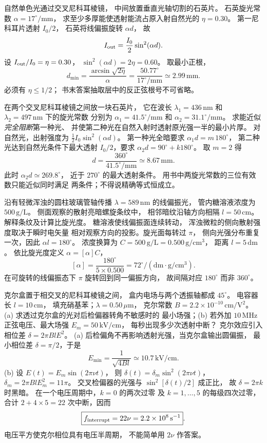 自然单色光通过交叉尼科耳棱镜，
中间放置垂直光轴切割的石英片。
石英旋光常数 $\alpha=17^\circ/\mathrm{mm}$，
求至少多厚能使透射能流占原入射自然光的
$\eta=0.30$。
\exsolution
第一尼科耳片透射 $I_0/2$，
石英将线偏振旋转 $\alpha d$，
故
\[
 I_{\rm out}=\frac{I_0}{2}\sin^2(\alpha d).
\]
设 $I_{\rm out}/I_0=\eta=0.30$，
$\sin^2(\alpha d)=2\eta=0.60$。
取最小正根，
\[
 \boxed{d_{\min}=
 \frac{\arcsin\sqrt{2\eta}}{\alpha}
 =\frac{50.77^\circ}{17^\circ/\mathrm{mm}}
 \simeq2.99\,\mathrm{mm}}.
\]
\excheck 必须有 $\eta\le1/2$；
书末答案抽取层中的反正弦根号不可省略。

在两个交叉尼科耳棱镜之间放一块石英片，
它在波长 $\lambda_1=436\,\mathrm{nm}$ 和
$\lambda_2=497\,\mathrm{nm}$ 下的旋光常数
分别为 $\alpha_1=41.5^\circ/\mathrm{mm}$
和 $\alpha_2=31.1^\circ/\mathrm{mm}$。
求能近似\emph{完全阻断}第一种光、
并使第二种光在自然入射时透射原光强一半的最小片厚。
\exsolution
对自然光，出射强度为
$\tfrac12 I_0\sin^2(\alpha d)$。
第一种光全暗要求
$\alpha_1d=m\,180^\circ$，
第二种光达到自然光条件下最大透射
$I_0/2$，要求
$\alpha_2d=90^\circ+k180^\circ$。
取 $m=2$ 得
\[
 \boxed{d=\frac{360^\circ}{41.5^\circ/\mathrm{mm}}
 \simeq8.67\,\mathrm{mm}}.
\]
此时 $\alpha_2d\simeq269.8^\circ$，
近于 $270^\circ$ 的最大透射条件。
\excheck 用书中两旋光常数的三位有效数只能近似同时满足
两条件；不得说精确等式恒成立。

沿有轻微浑浊的圆柱玻璃管轴传播
$\lambda=589\,\mathrm{nm}$ 的线偏振光，
管内糖溶液浓度为 $500\,\mathrm{g/L}$。
侧面观察的散射亮暗螺旋条纹中，
相邻暗纹沿轴方向相隔 $l=50\,\mathrm{cm}$。
解释条纹及计算比旋光度。
\exsolution
糖溶液使线偏振面连续转动，
浑浊微粒的侧向散射强度取决于瞬时电矢量
相对观察方向的投影。旋光面每转过 $\pi$，
侧向光强分布重复一次，因此
$\alpha l=180^\circ$。
浓度换算为
$C=500\,\mathrm{g/L}=0.500\,\mathrm{g/cm^3}$，
距离 $l=5\,\mathrm{dm}$。
依比旋光度定义 $\alpha=[\alpha]C$，
\[
 \boxed{[\alpha]=\frac{180^\circ}{5\times0.500}
 =72^\circ/(\mathrm{dm}\cdot\mathrm{g/cm^3})}.
\]
\excheck 在可旋转的线偏振态下 $\pi$ 旋转回到同一偏振方向，
故间隔对应 $180^\circ$ 而非 $360^\circ$。

克尔盒置于相交叉的尼科耳棱镜之间，
盒内电场与两个透振轴都成 $45^\circ$。
电容器长 $l=10\,\mathrm{cm}$，
填充硝基苯；$\lambda=0.50\,\mu\mathrm m$，
克尔常数 $B=2.2\times10^{-10}\,\mathrm{cm/V^2}$。
(a) 求透过克尔盒的光对后检偏器转角不敏感时的
最小场强；(b) 若外加 $10\,\mathrm{MHz}$
正弦电压、最大场强 $E_m=50\,\mathrm{kV/cm}$，
每秒出现多少次透射中断？
\exsolution
克尔效应引入相位差
$\delta=2\pi BlE^2$。
(a) 后检偏角不再影响透射光强，当克尔盒输出圆偏振，
最小相位差 $\delta=\pi/2$，于是
\[
 \boxed{E_{\min}=\frac1{\sqrt{4Bl}}
 \simeq10.7\,\mathrm{kV/cm}}.
\]
(b) 设 $E(t)=E_m\sin(2\pi\nu t)$，
则 $\delta(t)=\delta_m\sin^2(2\pi\nu t)$，
$\delta_m=2\pi BlE_m^2=11\pi$。
交叉检偏器的光强与 $\sin^2[\delta(t)/2]$ 成正比，
故 $\delta=2\pi k$ 时黑暗。
在一个电压周期中，$k=0$ 的两次过零
及 $k=1,\ldots,5$ 的每级四次过零，
合计 $2+4\times5=22$ 次中断，因而
\[
 \boxed{f_{\rm interrupt}=22\nu
 =2.2\times10^8\,\mathrm{s^{-1}}}.
\]
\excheck 电压平方使克尔相位具有电压半周期，
不能简单用 $2\nu$ 作答案。

